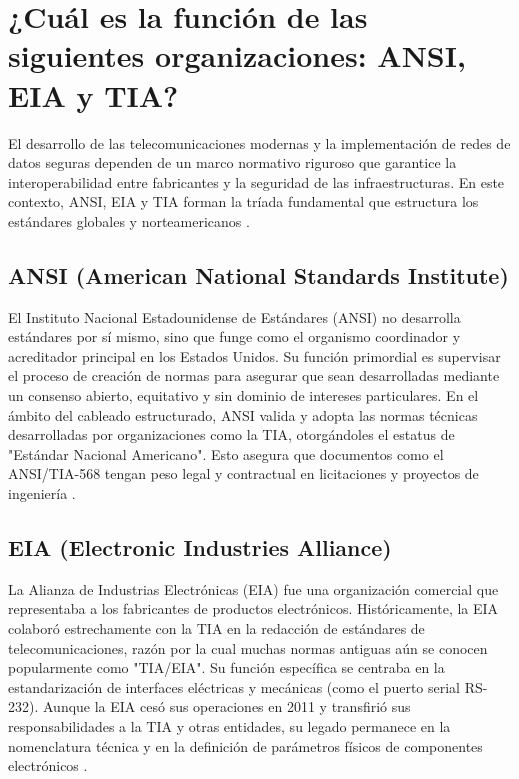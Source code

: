\documentclass[a4paper,12pt]{article}
\begin{document}
\setcounter{page}{1}

\tableofcontents

\newpage

\section{¿Cuál es la función de las siguientes organizaciones: ANSI, EIA y TIA?}

El desarrollo de las telecomunicaciones modernas y la implementación de redes de datos seguras dependen de un marco normativo riguroso que garantice la interoperabilidad entre fabricantes y la seguridad de las infraestructuras. En este contexto, ANSI, EIA y TIA forman la tríada fundamental que estructura los estándares globales y norteamericanos \cite{ansi_tia}.

\subsection{ANSI (American National Standards Institute)}
El Instituto Nacional Estadounidense de Estándares (ANSI) no desarrolla estándares por sí mismo, sino que funge como el organismo coordinador y acreditador principal en los Estados Unidos. Su función primordial es supervisar el proceso de creación de normas para asegurar que sean desarrolladas mediante un consenso abierto, equitativo y sin dominio de intereses particulares. En el ámbito del cableado estructurado, ANSI valida y adopta las normas técnicas desarrolladas por organizaciones como la TIA, otorgándoles el estatus de "Estándar Nacional Americano". Esto asegura que documentos como el ANSI/TIA-568 tengan peso legal y contractual en licitaciones y proyectos de ingeniería \cite{secproo}.

\subsection{EIA (Electronic Industries Alliance)}
La Alianza de Industrias Electrónicas (EIA) fue una organización comercial que representaba a los fabricantes de productos electrónicos. Históricamente, la EIA colaboró estrechamente con la TIA en la redacción de estándares de telecomunicaciones, razón por la cual muchas normas antiguas aún se conocen popularmente como "TIA/EIA". Su función específica se centraba en la estandarización de interfaces eléctricas y mecánicas (como el puerto serial RS-232). Aunque la EIA cesó sus operaciones en 2011 y transfirió sus responsabilidades a la TIA y otras entidades, su legado permanece en la nomenclatura técnica y en la definición de parámetros físicos de componentes electrónicos \cite{tabasco}.
\end{document}
